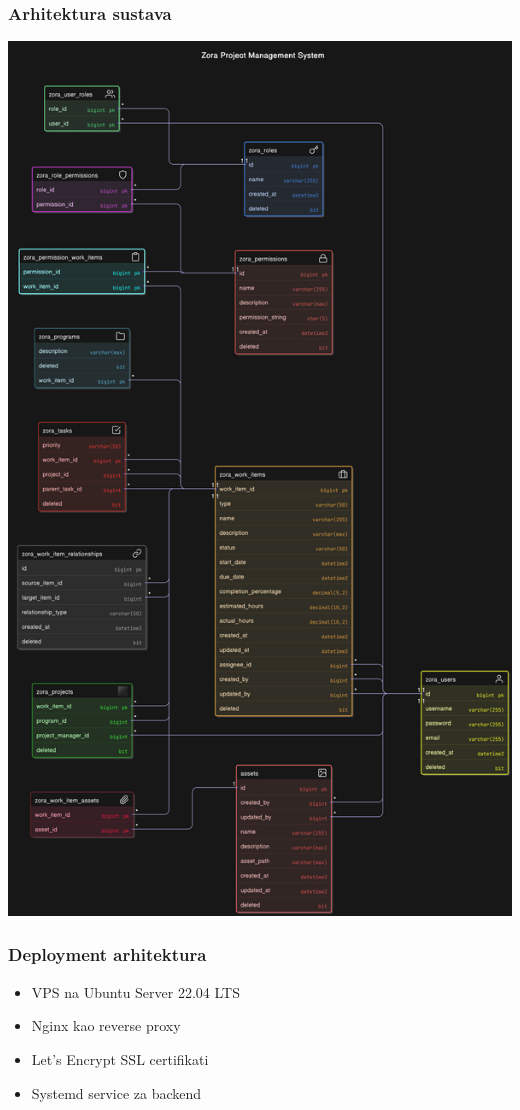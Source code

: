 \documentclass[aspectratio=169]{beamer}
\begin{document}
\begin{frame}
    \frametitle{Arhitektura sustava}
    \begin{center}
        \includegraphics[height=0.8\textheight]{../zora_diagram.png}
    \end{center}
\end{frame}

\begin{frame}
    \frametitle{Deployment arhitektura}
    \begin{itemize}
        \item VPS na Ubuntu Server 22.04 LTS
        \item Nginx kao reverse proxy
        \item Let's Encrypt SSL certifikati
        \item Systemd service za backend
    \end{itemize}
\end{frame}
\end{document}
